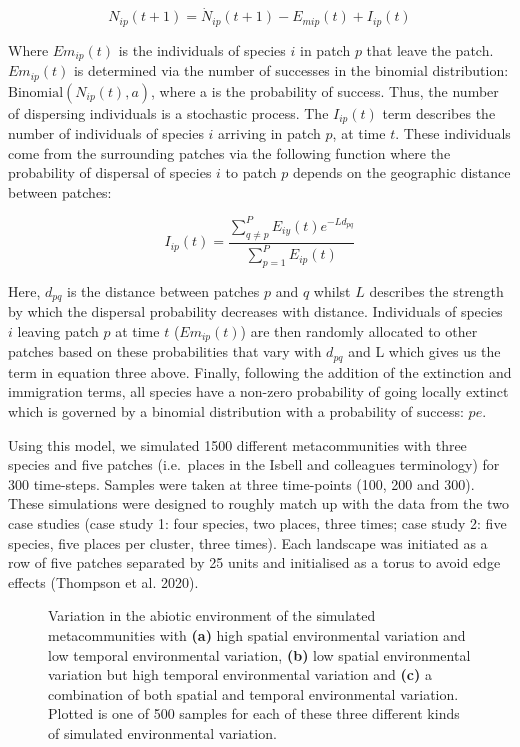 \documentclass[
  letterpaper,
  DIV=11,
  numbers=noendperiod]{scrartcl}
\begin{document}
\[
N_{ip}(t + 1) = \dot{N}_{ip}(t + 1) - E_{mip}(t) + I_{ip}(t) \tag{Equation S12}
\]

Where \(Em_{ip}(t)\) is the individuals of species \(i\) in patch \(p\)
that leave the patch. \(Em_{ip}(t)\) is determined via the number of
successes in the binomial distribution:
\(\text{Binomial}(N_{ip}(t), a)\), where a is the probability of
success. Thus, the number of dispersing individuals is a stochastic
process. The \(I_{ip}(t)\) term describes the number of individuals of
species \(i\) arriving in patch \(p\), at time \(t\). These individuals
come from the surrounding patches via the following function where the
probability of dispersal of species \(i\) to patch \(p\) depends on the
geographic distance between patches:

\[
I_{ip}(t) = \frac{\sum_{q \ne p}^{P} E_{iy}(t) e^{-L d_{pq}}}{\sum_{p=1}^{P} E_{ip}(t)} \tag{Equation S13}
\]

Here, \(d_{pq}\) is the distance between patches \(p\) and \(q\) whilst
\(L\) describes the strength by which the dispersal probability
decreases with distance. Individuals of species \(i\) leaving patch
\(p\) at time \(t\) (\(Em_{ip}(t)\)) are then randomly allocated to
other patches based on these probabilities that vary with \(d_{pq}\) and
L which gives us the term in equation three above. Finally, following
the addition of the extinction and immigration terms, all species have a
non-zero probability of going locally extinct which is governed by a
binomial distribution with a probability of success: \(pe\).

Using this model, we simulated 1500 different metacommunities with three
species and five patches (i.e.~places in the Isbell and colleagues
terminology) for 300 time-steps. Samples were taken at three time-points
(100, 200 and 300). These simulations were designed to roughly match up
with the data from the two case studies (case study 1: four species, two
places, three times; case study 2: five species, five places per
cluster, three times). Each landscape was initiated as a row of five
patches separated by 25 units and initialised as a torus to avoid edge
effects (Thompson et al. 2020).

\begin{figure}


\caption{\label{fig-s8}Variation in the abiotic environment of the
simulated metacommunities with \textbf{(a)} high spatial environmental
variation and low temporal environmental variation, \textbf{(b)} low
spatial environmental variation but high temporal environmental
variation and \textbf{(c)} a combination of both spatial and temporal
environmental variation. Plotted is one of 500 samples for each of these
three different kinds of simulated environmental variation.}

\end{figure}%
\end{document}
